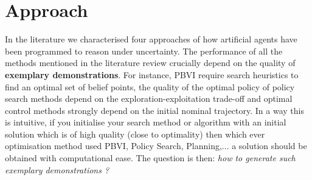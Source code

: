 % 

\section{Approach}

In the literature we characterised four approaches of how artificial agents have been programmed to reason under uncertainty. The performance 
of all the methods mentioned in the literature review crucially depend on the quality of \textbf{exemplary demonstrations}. For instance, PBVI 
require search heuristics to find an optimal set of belief points, the quality of the optimal policy of policy search methods depend on the exploration-exploitation trade-off
and optimal control methods strongly depend on the initial nominal trajectory. In a way this is intuitive, if you initialise your search method or algorithm 
with an initial solution which is of high quality (close to optimality) then which ever optimisation method used PBVI, Policy Search, Planning,... a solution 
should be obtained with computational ease. The question is then: \textit{how to generate such exemplary demonstrations ?} 

